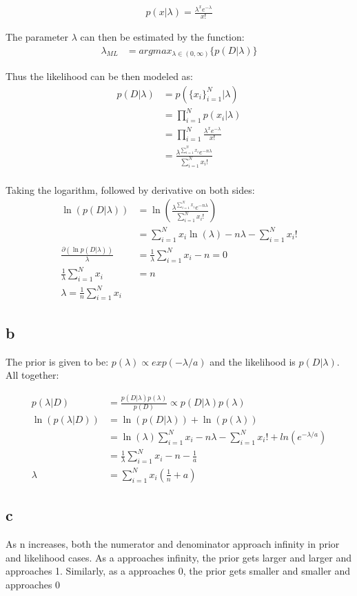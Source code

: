 \documentclass[a4paper]{article}
\begin{document}
\begin{align*}
    p(x|\lambda) = \frac{\lambda^{x}e^{-\lambda}}{x!}
\end{align*}{}

The parameter $\lambda$ can then be estimated by the function:
\begin{align*}
    \lambda_{ML} &= argmax_{\lambda \in (0, \infty)} \{p(D|\lambda)\}
\end{align*}{}

Thus the likelihood can be then modeled as:
\begin{align*}
    p(D|\lambda) &= p(\{x_i \}_{i=1}^{N}|\lambda) \\
    &= \prod_{i=1}^{N}p(x_i|\lambda) \\
    &= \prod_{i=1}^{N}\frac{\lambda^{x}e^{-\lambda}}{x!}\\
    &= \frac{\lambda^{\sum_{i=1}^{N}x_i}e^{-n\lambda}}{\sum_{i=1}^{N} x_{i}!} \\
\end{align*}{}

Taking the logarithm, followed by derivative on both sides:
\begin{align*}
    \ln(p(D|\lambda)) &= \ln\left(\frac{\lambda^{\sum_{i=1}^{N}x_i}e^{-n\lambda}}{\sum_{i=1}^{N} x_{i}!}\right) \\
    &= \sum_{i=1}^{N}x_i\ln(\lambda) - n\lambda - \sum_{i=1}^{N} x_{i}!\\
    \frac{\partial(\ln p(D|\lambda))}{\lambda} &= \frac{1}{\lambda}\sum_{i=1}^{N}x_i - n = 0 \\ \frac{1}{\lambda}\sum_{i=1}^{N}x_i &= n \\
    \lambda = \frac{1}{n}\sum_{i=1}^{N}x_i
\end{align*}{}

\subsection*{b}
The prior is given to be: $p(\lambda) \propto exp(-\lambda/a)$ and the likelihood is $p(D|\lambda)$. All together:

\begin{align*}
    p(\lambda| D) &= \frac{p(D|\lambda)p(\lambda)}{p(D)} \propto p(D|\lambda)p(\lambda)\\
    \ln(p(\lambda| D))&= \ln(p(D|\lambda)) + \ln(p(\lambda)) \\
    &= \ln(\lambda)\sum_{i=1}^{N}x_i - n\lambda - \sum_{i=1}^{N} x_{i}! + ln(e^{-\lambda/a}) \\
    &= \frac{1}{\lambda}\sum_{i=1}^{N}x_i - n -\frac{1}{a}\\
    \lambda &=  \sum_{i=1}^{N}x_i\left(\frac{1}{n} + a \right)
\end{align*}{}

\subsection*{c}
As n increases, both the numerator and denominator approach infinity in prior and likelihood cases. As a approaches infinity, the prior gets larger and larger and approaches 1. Similarly, as a approaches 0, the prior gets smaller and smaller and approaches 0
\end{document}
